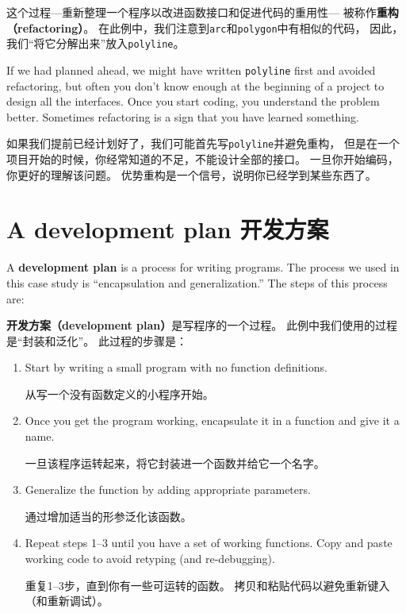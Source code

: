 \documentclass[10pt]{book}
\begin{document}
\begin{CJK}{UTF8}{gbsn}
这个过程---重新整理一个程序以改进函数接口和促进代码的重用性---
被称作{\bf 重构（refactoring）}。
在此例中，我们注意到{\tt arc}和{\tt polygon}中有相似的代码，
因此，我们``将它分解出来''放入{\tt polyline}。

If we had planned ahead, we might have written {\tt polyline} first
and avoided refactoring, but often you don't know enough at the
beginning of a project to design all the interfaces.  Once you start
coding, you understand the problem better.  Sometimes refactoring is a
sign that you have learned something.

如果我们提前已经计划好了，我们可能首先写{\tt polyline}并避免重构，
但是在一个项目开始的时候，你经常知道的不足，不能设计全部的接口。
一旦你开始编码，你更好的理解该问题。
优势重构是一个信号，说明你已经学到某些东西了。


\section{A development plan 开发方案}

A {\bf development plan} is a process for writing programs.
The process we used
in this case study is ``encapsulation and
generalization.''  The steps of this process are:

{\bf 开发方案（development plan）}是写程序的一个过程。
此例中我们使用的过程是``封装和泛化''。
此过程的步骤是：

\begin{enumerate}

\item Start by writing a small program with no function definitions.

从写一个没有函数定义的小程序开始。

\item Once you get the program working, encapsulate it in a function
and give it a name.

一旦该程序运转起来，将它封装进一个函数并给它一个名字。

\item Generalize the function by adding appropriate parameters.

通过增加适当的形参泛化该函数。

\item Repeat steps 1--3 until you have a set of working functions.
Copy and paste working code to avoid retyping (and re-debugging).

重复1--3步，直到你有一些可运转的函数。
拷贝和粘贴代码以避免重新键入（和重新调试）。


\end{enumerate}
\end{CJK}
\end{document}
